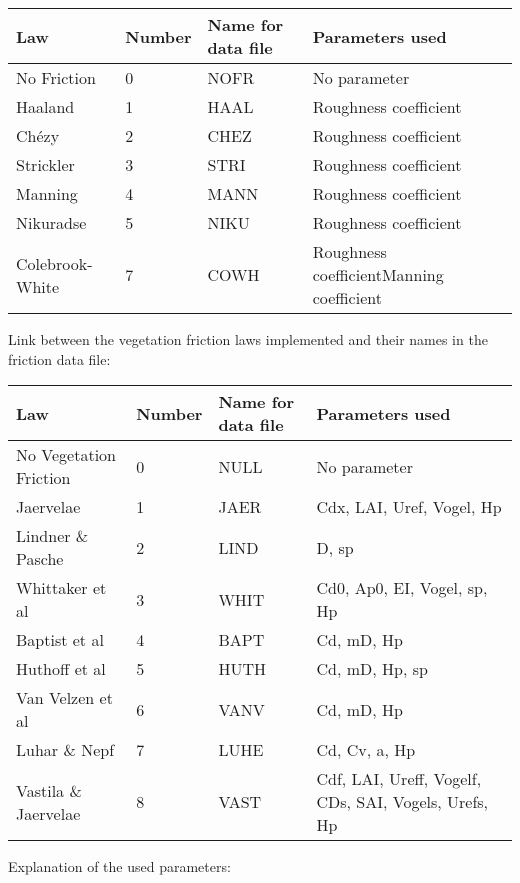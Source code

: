 \begin{tabular}{|p{1.0in}|p{0.5in}|p{0.8in}|p{1.0in}|} \hline
Law &  Number & Name for data file & Parameters used \\ \hline
No Friction & 0 & NOFR & No parameter \\ \hline
Haaland & 1 & HAAL & Roughness coefficient \\ \hline
Ch\'{e}zy & 2 & CHEZ & Roughness coefficient \\ \hline
Strickler & 3 & STRI & Roughness coefficient \\ \hline
Manning & 4 & MANN & Roughness coefficient \\ \hline
Nikuradse & 5 & NIKU & Roughness coefficient \\ \hline
Colebrook-White & 7 & COWH & Roughness coefficient\newline Manning coefficient \\ \hline
\end{tabular}



Link between the vegetation friction laws implemented and their names in the friction data file:

\begin{tabular}{|p{1.0in}|p{0.5in}|p{0.8in}|p{1.0in}|} \hline
 Law &  Number & Name for data file & Parameters used \\ \hline
No Vegetation Friction & 0 & NULL & No parameter \\ \hline
Jaervelae & 1 & JAER & Cdx, LAI, Uref, Vogel, Hp \\ \hline
Lindner \& Pasche& 2 & LIND & D, sp \\ \hline
Whittaker et al & 3 & WHIT & Cd0, Ap0, EI, Vogel, sp, Hp \\ \hline
Baptist et al & 4 & BAPT & Cd, mD, Hp \\ \hline
Huthoff et al & 5 & HUTH & Cd, mD, Hp, sp \\ \hline
Van Velzen et al & 6 & VANV & Cd, mD, Hp \\ \hline
Luhar \& Nepf & 7 & LUHE & Cd, Cv, a, Hp \\ \hline
Vastila \& Jaervelae & 8 & VAST & Cdf, LAI, Ureff, Vogelf, CDs,  SAI, Vogels, Urefs, Hp \\ \hline
\end{tabular}

Explanation of the used parameters: 

